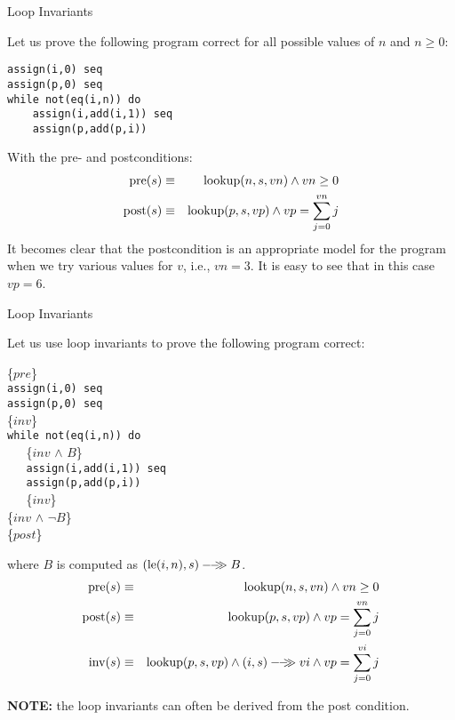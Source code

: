 \documentclass{beamer}
\begin{document}
\begin{frame}[fragile]{Loop Invariants}

\scriptsize

Let us  prove the following program correct for all possible 
values of $n$ and $n \ge 0$:

\begin{verbatim}
assign(i,0) seq
assign(p,0) seq
while not(eq(i,n)) do 
    assign(i,add(i,1)) seq
    assign(p,add(p,i)) 
\end{verbatim}

\vspace{.1in}
With the pre- and postconditions:
\begin{eqnarray*}
{\rm pre}(s) &\equiv & {\rm lookup}(n,s,vn) \wedge vn \ge 0\\
{\rm post}(s) &\equiv& {\rm lookup}(p,s,vp) \wedge vp = \sum_{j=0}^{vn} j\\
\end{eqnarray*}
It becomes clear that the postcondition is an appropriate model for the program when
we try various values for $v$, i.e., $vn =3$.  It is easy to see that in this case
$vp = 6$.
\end{frame}


\begin{frame}[fragile]{Loop Invariants}

\scriptsize

Let us use loop invariants to prove the following program correct:

\vspace{.1in}
{
{\color{red}\{$pre$\}}\\
{\tt assign(i,0) seq}\\
{\tt assign(p,0) seq}\\
{\color{red}\{$inv$\}  }\\                                  
{\tt while not(eq(i,n)) do }\\
{\tt\verb"   "} {\color{red}\{$inv$ $\wedge$  $B$\}  }\\

{\tt\verb"   "}{\tt assign(i,add(i,1)) seq }  \\
{\tt\verb"   "}{\tt assign(p,add(p,i))}  \\
{\tt\verb"   "}{\color{red}\{$inv$\} } \\                            
{\color{red}\{$inv$ $\wedge$ $\neg B$\}}\\
{\color{red}\{$post$\} } 
}

\vspace{.1in}

where $B$ is computed as ${({\rm le}(i,n),s)}-\!\!-\!\!\!\!\gg{B}$.
\begin{eqnarray*}
{\rm pre}(s) &\equiv & {\rm lookup}(n,s,vn)\wedge vn \ge 0\\
{\rm post}(s) &\equiv& {\rm lookup}(p,s,vp) \wedge vp = \sum_{j=0}^{vn} j\\
{\rm inv}(s) &\equiv& {\rm lookup}(p,s,vp) \wedge {(i,s)}-\!\!-\!\!\!\!\gg{vi} \wedge vp = \sum_{j=0}^{vi} j
\end{eqnarray*}

{\bf NOTE:} the loop invariants can often be derived from the post condition.
\end{frame}
\end{document}
